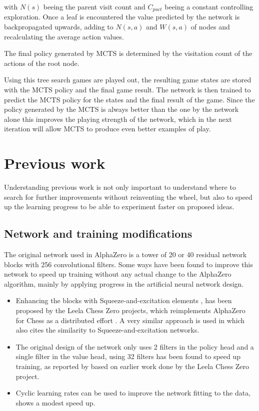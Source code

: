 \documentclass[12pt,onecolumn,oneside,titlepage]{article}
\begin{document}
with $N(s)$ beeing the parent visit count and $C_{puct}$ beeing a constant controlling exploration.
Once a leaf is encountered the value predicted by the network is backpropagated upwards, adding to $N(s,a)$ and $W(s,a)$ of nodes and recalculating the average action values.

The final policy generated by MCTS is determined by the visitation count of the actions of the root node.

Using this tree search games are played out, the resulting game states are stored with the MCTS policy and the final game result. The network is then trained to predict the MCTS policy for the states and the final result of the game.
Since the policy generated by the MCTS is always better than the one by the network alone this improves the playing strength of the network, which in the next iteration will allow MCTS to produce even better examples of play.

\section{Previous work}

Understanding previous work is not only important to understand where to search for further improvements without reinventing the wheel, but also to speed up the learning progress to be able to experiment faster on proposed ideas.

\subsection{Network and training modifications}

The original network used in AlphaZero is a tower of 20 or 40 residual network blocks with 256 convolutional filters. Some ways have been found to improve this network to speed up training without any actual change to the AlphaZero algorithm, mainly by applying progress in the artificial neural network design.

\begin{itemize}
 \item Enhancing the blocks with Squeeze-and-excitation elements \cite{hu2018squeeze}, has been proposed by the Leela Chess Zero projects, which reimplements AlphaZero for Chess as a distributed effort \cite{leela0sq}.
       A very similar approach is used in \cite{wu2019accelerating} which also cites the similarity to Squeeze-and-excitation networks.
 \item The original design of the network only uses 2 filters in the policy head and a single filter in the value head, using 32 filters has been found to speed up training, as reported by \cite{oracledevs6} based on earlier work done by the Leela Chess Zero project.
 \item Cyclic learning rates can be used to improve the network fitting to the data, \cite{oracledevs6} shows a modest speed up.
\end{itemize}
\end{document}

